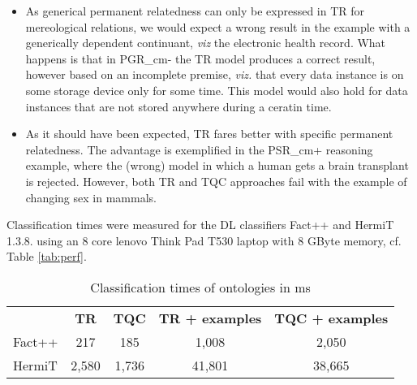 \begin{itemize}
\item
As generical permanent relatedness can only be expressed in TR for mereological relations, we would 
expect a wrong result in the example with a generically dependent continuant, \emph{viz} 
the electronic health record. What happens is that in PGR\_cm- the TR model produces a correct
result, however based on an incomplete premise, \emph{viz.} that every data instance is on some storage 
device only for some time. This model would also hold for data instances that are not stored anywhere
during a ceratin time. 

\item
As it should have been expected, TR fares better with specific permanent relatedness. The advantage is exemplified
in the PSR\_cm+ reasoning example, where the (wrong) model in which a human gets a brain transplant
is rejected. However, both TR and TQC approaches fail with the example of changing sex in mammals.
  
\end{itemize}
  
Classification times were measured for the DL classifiers Fact++ and HermiT 1.3.8. using an 8 core lenovo Think Pad T530 laptop with 
8 GByte memory, cf. Table \ref{tab:perf}.




\begin{table}
\caption{Classification times of ontologies in ms}
\label{tab:perf}
\centering
\begin{tabular}{ l c c c c }
\hline
 &  {\bf TR} & {\bf TQC} & {\bf TR + examples} & {\bf TQC + examples} \\
Fact++	 & 217	& 185	& 1,008 & 2,050 \\
HermiT & 2,580 & 1,736 & 41,801 & 38,665\\ 
\end{tabular}
\label{tab:cases}
\end{table}


  
  
